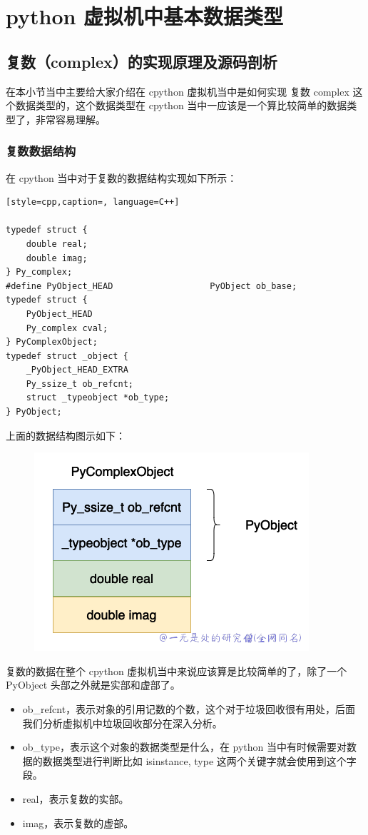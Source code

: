 \chapter{python 虚拟机中基本数据类型}
\section{复数（complex）的实现原理及源码剖析}
在本小节当中主要给大家介绍在 cpython 虚拟机当中是如何实现 复数 complex 这个数据类型的，这个数据类型在 cpython 当中一应该是一个算比较简单的数据类型了，非常容易理解。
\subsection{复数数据结构}
在 cpython 当中对于复数的数据结构实现如下所示：
\begin{lstlisting}[style=cpp,caption=, language=C++]

typedef struct {
    double real;
    double imag;
} Py_complex;
#define PyObject_HEAD                   PyObject ob_base;
typedef struct {
    PyObject_HEAD
    Py_complex cval;
} PyComplexObject;
typedef struct _object {
    _PyObject_HEAD_EXTRA
    Py_ssize_t ob_refcnt;
    struct _typeobject *ob_type;
} PyObject;
\end{lstlisting}
上面的数据结构图示如下：

    \begin{figure}[h]
        \centering
            \includegraphics[scale=.5]{images/23-int.png}
            \caption{ }
        \label{fig:my_label}
    \end{figure}
    
复数的数据在整个 cpython 虚拟机当中来说应该算是比较简单的了，除了一个 PyObject 头部之外就是实部和虚部了。
\begin{itemize}
\item ob\_refcnt，表示对象的引用记数的个数，这个对于垃圾回收很有用处，后面我们分析虚拟机中垃圾回收部分在深入分析。 
\item ob\_type，表示这个对象的数据类型是什么，在 python 当中有时候需要对数据的数据类型进行判断比如 isinstance, type 这两个关键字就会使用到这个字段。 
\item real，表示复数的实部。 
\item imag，表示复数的虚部。 
\end{itemize}
